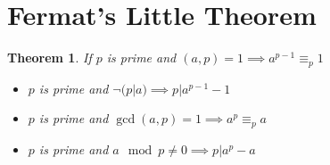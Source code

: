 \documentclass[twoside]{article}
\newcounter{lecnum}
\newtheorem{theorem}{Theorem}[lecnum]
\begin{document}
\section{Fermat's Little Theorem}
\begin{theorem}
	If $p$ is prime and $(a,p)=1 \implies a^{p-1} \equiv_p 1$\\
	\begin{itemize}Equivalently
		\item $p$ is prime and $\neg (p|a) \implies p|a^{p-1}-1$
		\item $p$ is prime and $\gcd(a,p)=1  \implies a^p \equiv_p a$
		\item $p$ is prime and $a \mod p \neq 0 \implies p|a^p-a$
	\end{itemize}
\end{theorem}
\end{document}
